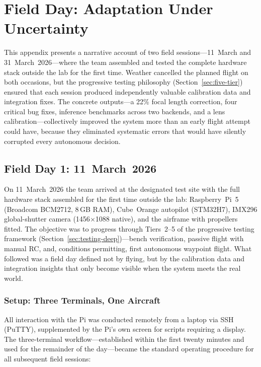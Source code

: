 \section{Field Day: Adaptation Under Uncertainty}\label{sec:field-day}

This appendix presents a narrative account of two field sessions---11~March and 31~March~2026---where the team assembled and tested the complete hardware stack outside the lab for the first time.  Weather cancelled the planned flight on both occasions, but the progressive testing philosophy (Section~\ref{sec:five-tier}) ensured that each session produced independently valuable calibration data and integration fixes.  The concrete outputs---a 22\% focal length correction, four critical bug fixes, inference benchmarks across two backends, and a lens calibration---collectively improved the system more than an early flight attempt could have, because they eliminated systematic errors that would have silently corrupted every autonomous decision.

\subsection{Field Day 1: 11~March~2026}\label{sec:field-day-1}

On 11~March~2026 the team arrived at the designated test site with the full hardware stack assembled for the first time outside the lab: Raspberry~Pi~5 (Broadcom BCM2712, 8\,GB RAM), Cube~Orange autopilot (STM32H7), IMX296 global-shutter camera (1456$\times$1088 native), and the airframe with propellers fitted.  The objective was to progress through Tiers~2--5 of the progressive testing framework (Section~\ref{sec:testing-deep})---bench verification, passive flight with manual RC, and, conditions permitting, first autonomous waypoint flight.  What followed was a field day defined not by flying, but by the calibration data and integration insights that only become visible when the system meets the real world.

\subsubsection{Setup: Three Terminals, One Aircraft}\label{sec:field-setup}

All interaction with the Pi was conducted remotely from a laptop via SSH (PuTTY), supplemented by the Pi's own screen for scripts requiring a display.  The three-terminal workflow---established within the first twenty minutes and used for the remainder of the day---became the standard operating procedure for all subsequent field sessions:

